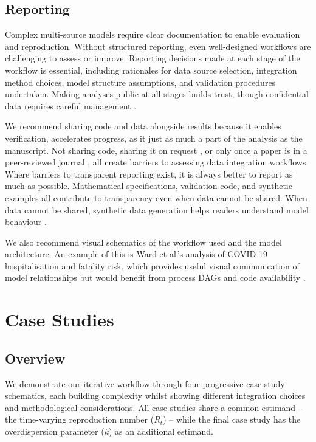 \documentclass{article}
\begin{document}
\subsection{Reporting} \label{sec:reporting}
Complex multi-source models require clear documentation to enable evaluation and reproduction.
Without structured reporting, even well-designed workflows are challenging to assess or improve.
Reporting decisions made at each stage of the workflow is essential, including rationales for data source selection, integration method choices, model structure assumptions, and validation procedures undertaken.
Making analyses public at all stages builds trust, though confidential data requires careful management \citep{Abbott2021-delta, Abbott2022-prevalence}.

We recommend sharing code and data alongside results because it enables verification, accelerates progress, as it just as much a part of the analysis as the manuscript.
Not sharing code, sharing it on request \citep{Ward2024-sp}, or only once a paper is in a peer-reviewed journal \citep{Fyles2024-qz} , all create barriers to assessing data integration workflows.
Where barriers to transparent reporting exist, it is always better to report as much as possible.
Mathematical specifications, validation code, and synthetic examples all contribute to transparency even when data cannot be shared.
When data cannot be shared, synthetic data generation helps readers understand model behaviour \citep{Mellor2025-norovirus}.

We also recommend visual schematics of the workflow used and the model architecture. An example of this is Ward et al.'s analysis of COVID-19 hospitalisation and fatality risk, which provides useful visual communication of model relationships but would benefit from process DAGs and code availability \citep{Ward2024-sp}.

\section{Case Studies}

\subsection{Overview}

We demonstrate our iterative workflow through four progressive case study schematics, each building complexity whilst showing different integration choices and methodological considerations.
All case studies share a common estimand -- the time-varying reproduction number ($R_t$) -- while the final case study has the overdispersion parameter ($k$) as an additional estimand.
\end{document}

